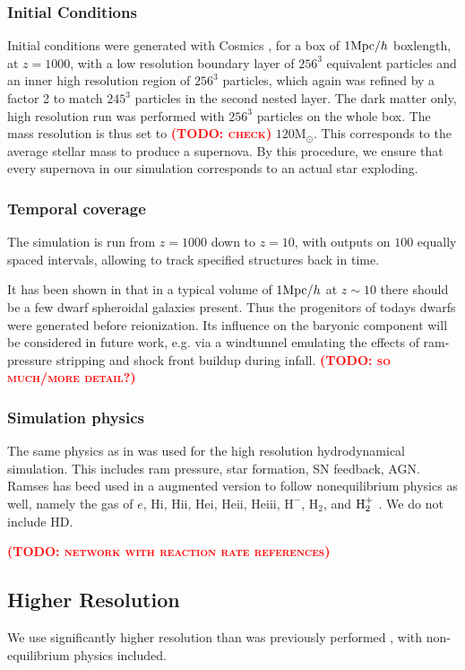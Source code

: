 \documentclass[useAMS,usenatbib]{mn2e}
\def\Msun{\mathrm{M}_{\odot}}
\newcommand{\TODO}[1]{\textsc{\textbf{\textcolor{red}{(TODO: #1)}}}}
\begin{document}
\subsubsection{Initial Conditions}
Initial conditions were generated with {\sc Cosmics}
\citep{Bertschinger1995}, for a box of $1{\rm Mpc}/h$ boxlength, at
$z=1000$, with a low resolution boundary layer of $256^3$ equivalent
particles and an inner high resolution region of $256^3$ particles,
which again was refined by a factor 2 to match $245^3$ particles in
the second nested layer. The dark matter only, high resolution run was
performed with $256^3$ particles on the whole box. The mass resolution
is thus set to \TODO{check} $120\Msun$. This corresponds to the
average stellar mass to produce a supernova. By this procedure, we
ensure that every supernova in our simulation corresponds to an actual
star exploding.

\subsubsection{Temporal coverage}
The simulation is run from $z=1000$ down to $z=10$, with outputs on
$100$ equally spaced intervals, allowing to track specified structures
back in time.

It has been shown in \cite{Boley2009} that in a typical volume of
$1{\rm Mpc}/h$ at $z\sim10$ there should be a few dwarf spheroidal
galaxies present. Thus the progenitors of todays dwarfs were generated
before reionization. Its influence on the baryonic component will be
considered in future work, e.g. via a windtunnel emulating the effects
of ram-pressure stripping and shock front buildup during
infall. \TODO{so much/more detail?}

\subsubsection{Simulation physics}
The same physics as in \cite{Boley2009} was used for the high
resolution hydrodynamical simulation. This includes ram pressure, star
formation, SN feedback, AGN. {\sc Ramses} has beed used in a augmented
version to follow nonequilibrium physics as well, namely the gas of
$e$, {\sc Hi}, {\sc Hii}, {\sc Hei}, {\sc Heii}, {\sc Heiii}, $\textrm{H}^-$,
H$_2$, and ${\textrm H}_2^+$ \citep{Abel1997}. We do not include $\textrm{HD}$.

\TODO{network with reaction rate references}

\subsection{Higher Resolution}
We use significantly higher resolution than was previously performed
\citep{Boley2009}, with non-equilibrium physics included.
\end{document}
